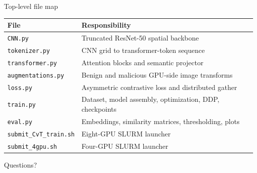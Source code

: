 \documentclass[aspectratio=169,10pt]{beamer}
\newcommand{\file}[1]{\texttt{#1}}
\begin{document}
\begin{frame}{Top-level file map}
  \centering
  \begin{tabular}{ll}
    \toprule
    File & Responsibility\\
    \midrule
    \file{CNN.py} & Truncated ResNet-50 spatial backbone\\
    \file{tokenizer.py} & CNN grid to transformer-token sequence\\
    \file{transformer.py} & Attention blocks and semantic projector\\
    \file{augmentations.py} & Benign and malicious GPU-side image transforms\\
    \file{loss.py} & Asymmetric contrastive loss and distributed gather\\
    \file{train.py} & Dataset, model assembly, optimization, DDP, checkpoints\\
    \file{eval.py} & Embeddings, similarity matrices, thresholding, plots\\
    \file{submit\_CvT\_train.sh} & Eight-GPU SLURM launcher\\
    \file{submit\_4gpu.sh} & Four-GPU SLURM launcher\\
    \bottomrule
  \end{tabular}
\end{frame}

\begin{frame}
  \centering
  \Huge Questions?
\end{frame}
\end{document}
